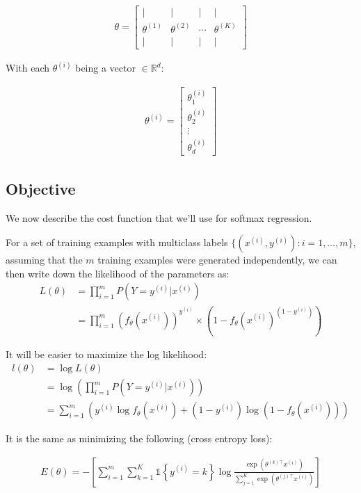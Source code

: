 \begin{align}
	\theta = \left[\begin{array}{cccc}| & | & | & | \\ \theta^{(1)} & \theta^{(2)} & \cdots & \theta^{(K)} \\ | & | & | & | \end{array}\right]
\end{align}

With each $\theta^{(i)}$ being a vector $\in \mathbb{R}^{d}$:

\begin{align}
	\theta^{(i)} = \left[
		\begin{array}{cccc}
			\theta_{1}^{(i)} \\
			\theta_{2}^{(i)} \\
			\vdots \\
			\theta_{d}^{(i)}
		\end{array}\right]
\end{align}


\subsection{Objective}

We now describe the cost function that we’ll use for softmax regression.

For a set of training examples with multiclass labels $\{ (x^{(i)}, y^{(i)}) : i=1,\ldots,m\}$, assuming that the $m$ training examples were generated independently, we can then write down the likelihood of the parameters as:
\begin{align}
	L(\theta) &= \prod_{i=1}^m P(Y=y^{(i)} | x^{(i)} ) \\
			  &= \prod_{i=1}^m (f_\theta(x^{(i)}))^{y^{(i)}} \times (1 - f_\theta(x^{(i)})^{(1-y^{(i)})})
\end{align}

It will be easier to maximize the log likelihood:
\begin{align}
	l(\theta) &= \log L(\theta) \\
			  &= \log \left( \prod_{i=1}^m P(Y=y^{(i)} | x^{(i)}) \right) \\
			  &= \sum_{i=1}^m \left( y^{(i)}\log f_\theta(x^{(i)}) + (1-y^{(i)})\log (1 - f_\theta(x^{(i)})) \right)
\end{align}

It is the same as minimizing the following (cross entropy loss):

\begin{align} 
	E(\theta) = - \left[ \sum_{i=1}^{m} \sum_{k=1}^{K} \mathds{1}\left\{y^{(i)} = k\right\} \log \frac{\exp(\theta^{(k)\top} x^{(i)})}{\sum_{j=1}^K \exp(\theta^{(j)\top} x^{(i)})}\right] 
\end{align}


